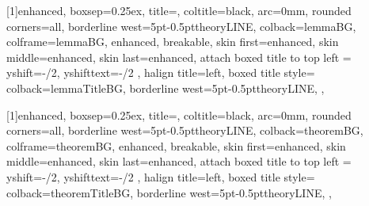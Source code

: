 \lstset{style=mystyle}

\renewcommand{\chaptermark}[1]{%
\markboth{\thechapter.\ #1}{}}



\captionsetup{justification = centering}



[1]{enhanced,
    boxsep=0.25ex,
    title=\textbf{},
    coltitle=black,
    arc=0mm,
    rounded corners=all,
    borderline west={5pt}{-0.5pt}{theoryLINE},
    colback=lemmaBG,
    colframe=lemmaBG,
    enhanced,
    breakable,
    skin first=enhanced,
    skin middle=enhanced,
    skin last=enhanced,
    attach boxed title to top left ={
        yshift=-\tcboxedtitleheight/2,
        yshifttext=-\tcboxedtitleheight/2
    },
    halign title=left,
    boxed title style={
        colback=lemmaTitleBG,
        borderline west={5pt}{-0.5pt}{theoryLINE},
    },
}  %

[1]{enhanced,
    boxsep=0.25ex,
    title=,
    coltitle=black,
    arc=0mm,
    rounded corners=all,
    borderline west={5pt}{-0.5pt}{theoryLINE},
    colback=theoremBG,
    colframe=theoremBG,
    enhanced,
    breakable,
    skin first=enhanced,
    skin middle=enhanced,
    skin last=enhanced,
    attach boxed title to top left ={
        yshift=-\tcboxedtitleheight/2,
        yshifttext=-\tcboxedtitleheight/2
    },
    halign title=left,
    boxed title style={%
        colback=theoremTitleBG,
        borderline west={5pt}{-0.5pt}{theoryLINE},
    },
}  %


